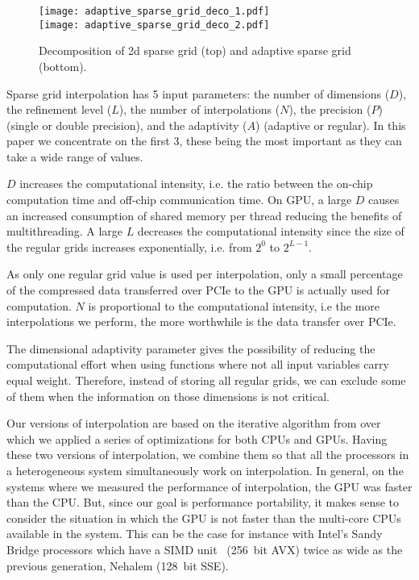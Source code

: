 \begin{figure}[h]
  \centering
  \texttt{[image: adaptive\_sparse\_grid\_deco\_1.pdf]} \\
  \vspace{20pt}
  \texttt{[image: adaptive\_sparse\_grid\_deco\_2.pdf]}
  \caption{Decomposition of 2d sparse grid (top) and adaptive sparse grid
  (bottom).}
  \label{fig:adaptive_sparse_grid_deco}
\end{figure}

Sparse grid interpolation has 5 input parameters: the number of dimensions
($D$), the refinement level ($L$), the number of interpolations ($N$), the
precision ($P$) (single or double precision), and the adaptivity ($A$) (adaptive
or regular). In this paper we concentrate on the first 3, these being the most
important as they can take a wide range of values.

$D$ increases the computational intensity, i.e. the ratio between the on-chip
computation time and off-chip communication time. On GPU, a large $D$ causes an
increased consumption of shared memory per thread reducing the benefits of
multithreading. A large $L$ decreases the computational intensity since the size
of the regular grids increases exponentially, i.e. from $2^0$ to $2^{L-1}$. 

As only one regular grid value is used per interpolation, only a small
percentage of the compressed data transferred over PCIe to the GPU is actually
used for computation. $N$ is proportional to the computational intensity, i.e
the more interpolations we perform, the more worthwhile is the data transfer over
PCIe.

The dimensional adaptivity parameter gives the possibility of reducing the
computational effort when using functions where not all input variables carry
equal weight. Therefore, instead of storing all regular grids, we can exclude
some of them when the information on those dimensions is not critical.

Our versions of interpolation are based on the iterative algorithm from
\cite{Murarasu:2011:CDS:1941553.1941559} over which we applied a series of
optimizations for both CPUs and GPUs. Having these two versions of
interpolation, we combine them so that all the processors in a heterogeneous
system simultaneously work on interpolation. In general, on the systems where we
measured the performance of interpolation, the GPU was faster than the CPU. But,
since our goal is performance portability, it makes sense to consider the
situation in which the GPU is not faster than the multi-core CPUs available in
the system. This can be the case for instance with Intel's Sandy Bridge
processors which have a SIMD unit~\cite{avx} (256~bit AVX) twice as wide as the
previous generation, Nehalem (128~bit SSE).

